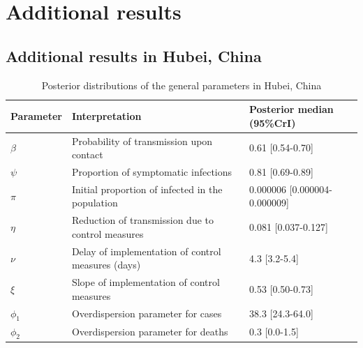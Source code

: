 \documentclass{article}
\begin{document}
	
\clearpage	
\section{Additional results}
\label{addres}

\subsection{Additional results in Hubei, China}

\begin{table}[H]
	\centering
	\begin{tabular}{lll}
		\hline
		Parameter & Interpretation & Posterior median (95\%CrI) \\ 
		\hline
		$\beta$ & Probability of transmission upon contact & 0.61 [0.54-0.70] \\ 
		$\psi$ & Proportion of symptomatic infections & 0.81 [0.69-0.89] \\ 
		$\pi$ & Initial proportion of infected in the population & 0.000006 [0.000004-0.000009] \\ 
		$\eta$ & Reduction of transmission due to control measures & 0.081 [0.037-0.127] \\ 
		$\nu$ & Delay of implementation of control measures (days) & 4.3 [3.2-5.4] \\ 
		$\xi$ & Slope of implementation of control measures & 0.53 [0.50-0.73] \\ 
		$\phi_1$ & Overdispersion parameter for cases & 38.3 [24.3-64.0] \\ 
		$\phi_2$ & Overdispersion parameter for deaths & 0.3 [0.0-1.5] \\ 
		\hline
	\end{tabular}
	\caption{Posterior distributions of the general parameters in Hubei, China} 
\end{table}
\end{document}
